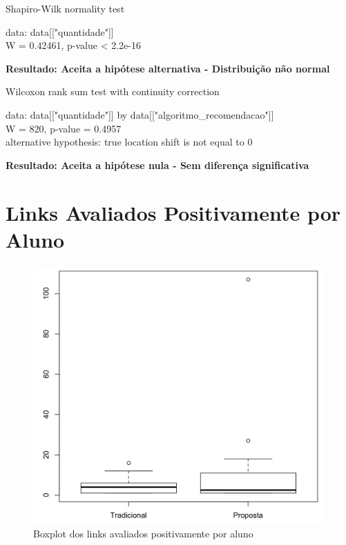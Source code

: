 Shapiro-Wilk normality test

\noindent
data:  data[["quantidade"]]\\
W = 0.42461, p-value < 2.2e-16

\noindent
\textbf{Resultado: Aceita a hipótese alternativa - Distribuição não normal}

Wilcoxon rank sum test with continuity correction

\noindent
data:  data[["quantidade"]] by data[["algoritmo\_recomendacao"]]\\
W = 820, p-value = 0.4957\\
alternative hypothesis: true location shift is not equal to 0

\noindent
\textbf{Resultado: Aceita a hipótese nula - Sem diferença significativa}

\newpage
\section{Links Avaliados Positivamente por Aluno}

\begin{figure}[htb]
  \caption{\label{fig:avaliados-positivamente-boxplot}Boxplot dos links avaliados positivamente por aluno}
  \begin{center}
      \includegraphics[scale=0.4]{./Figuras/avaliados-positivamente-boxplot.png}
  \end{center}
\end{figure}

